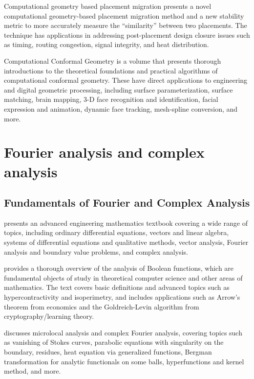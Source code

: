 \documentclass{article}
\begin{document}
\cite{Luo2005ComputationalGB} Computational geometry based placement migration presents a novel computational geometry-based placement migration method and a new stability metric to more accurately measure the ``similarity'' between two placements. The technique has applications in addressing post-placement design closure issues such as timing, routing congestion, signal integrity, and heat distribution.

\cite{Yau2016ComputationalCG} Computational Conformal Geometry is a volume that presents thorough introductions to the theoretical foundations and practical algorithms of computational conformal geometry. These have direct applications to engineering and digital geometric processing, including surface parameterization, surface matching, brain mapping, 3-D face recognition and identification, facial expression and animation, dynamic face tracking, mesh-spline conversion, and more.


\section{Fourier analysis and complex analysis}

\subsection{Fundamentals of Fourier and Complex Analysis}

\cite{Zill2021AdvancedEM} presents an advanced engineering mathematics textbook covering a wide range of topics, including ordinary differential equations, vectors and linear algebra, systems of differential equations and qualitative methods, vector analysis, Fourier analysis and boundary value problems, and complex analysis.

\cite{O'Donnell2014AnalysisOB} provides a thorough overview of the analysis of Boolean functions, which are fundamental objects of study in theoretical computer science and other areas of mathematics. The text covers basic definitions and advanced topics such as hypercontractivity and isoperimetry, and includes applications such as Arrow's theorem from economics and the Goldreich-Levin algorithm from cryptography/learning theory.

\cite{fujita2002microlocal} discusses microlocal analysis and complex Fourier analysis, covering topics such as vanishing of Stokes curves, parabolic equations with singularity on the boundary, residues, heat equation via generalized functions, Bergman transformation for analytic functionals on some balls, hyperfunctions and kernel method, and more.
\end{document}
